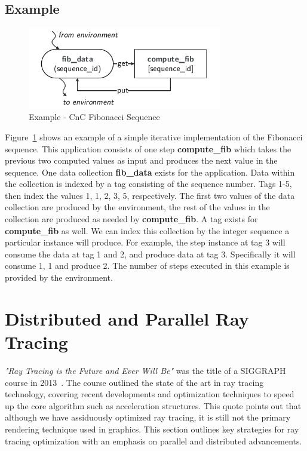 \subsection{Example}
\label{sec:cnc_example}

\begin{figure}[!tb]
  \centering
  \includegraphics[width=3.33in]{drawings/examples/FibExample.pdf}
  \caption{Example - CnC Fibonacci Sequence}
  \label{fig:fib_graph}
\end{figure}

Figure~\ref{fig:fib_graph} shows an example of a
simple iterative implementation of the Fibonacci sequence. This
application consists of one step \textbf{compute\_fib} which takes
the previous two computed values as input and produces the next value in
the sequence. One data collection \textbf{fib\_data} exists for the
application. Data within the collection is indexed by a tag consisting
of the sequence number. Tags 1-5, then index the values 1,
1, 2, 3, 5, respectively. The first two values of the data collection
are produced by the environment, the rest of the values in the
collection are produced as needed by \textbf{compute\_fib}. A tag
exists for \textbf{compute\_fib} as well. We can index this collection by the
integer sequence a particular instance will produce. For example, the step
instance at tag 3 will consume the data at tag 1 and 2, and produce
data at tag 3. Specifically it will consume 1, 1 and produce 2.
The number of steps executed in this example is provided by the 
environment.

\section{Distributed and Parallel Ray Tracing}
\label{sec:ray_tracing}

\emph{"Ray Tracing is the Future and Ever Will Be"} was the title of a SIGGRAPH 
course in 2013~\cite{proceedings-keller}.  The course outlined the
state of the art in ray tracing technology, covering recent developments and
optimization techniques to speed up the core algorithm such as acceleration
structures.  This quote points out that although we have
assiduously optimized ray tracing, it is still not the primary rendering
technique used in graphics.  This section outlines key strategies for ray
tracing optimization with an emphasis on parallel and distributed advancements.

